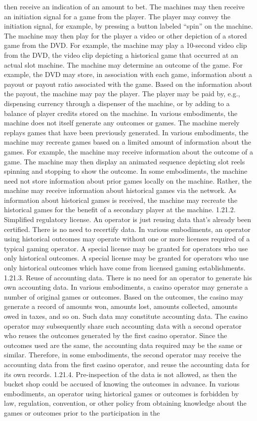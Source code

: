 \documentclass[11pt,a4paper]{article}
\begin{document}
then receive an indication of an amount to bet. The machines may then receive an initiation signal for a game from the player. The player may convey the initiation signal, for example, by pressing a button labeled “spin” on the machine. The machine may then play for the player a video or other depiction of a stored game from the DVD. For example, the machine may play a 10-second video clip from the DVD, the video clip depicting a historical game that occurred at an actual slot machine. The machine may determine an outcome of the game. For example, the DVD may store, in association with each game, information about a payout or payout ratio associated with the game. Based on the information about the payout, the machine may pay the player. The player may be paid by, e.g., dispensing currency through a dispenser of the machine, or by adding to a balance of player credits stored on the machine. In various embodiments, the machine does not itself generate any outcomes or games. The machine merely replays games that have been previously generated. In various embodiments, the machine may recreate games based on a limited amount of information about the games. For example, the machine may receive information about the outcome of a game. The machine may then display an animated sequence depicting slot reels spinning and stopping to show the outcome. In some embodiments, the machine need not store information about prior games locally on the machine. Rather, the machine may receive information about historical games via the network. As information about historical games is received, the machine may recreate the historical games for the benefit of a secondary player at the machine. 1.21.2. Simplified regulatory license. An operator is just reusing data that's already been certified. There is no need to recertify data. In various embodiments, an operator using historical outcomes may operate without one or more licenses required of a typical gaming operator. A special license may be granted for operators who use only historical outcomes. A special license may be granted for operators who use only historical outcomes which have come from licensed gaming establishments. 1.21.3. Reuse of accounting data. There is no need for an operator to generate his own accounting data. In various embodiments, a casino operator may generate a number of original games or outcomes. Based on the outcomes, the casino may generate a record of amounts won, amounts lost, amounts collected, amounts owed in taxes, and so on. Such data may constitute accounting data. The casino operator may subsequently share such accounting data with a second operator who reuses the outcomes generated by the first casino operator. Since the outcomes used are the same, the accounting data required may be the same or similar. Therefore, in some embodiments, the second operator may receive the accounting data from the first casino operator, and reuse the accounting data for its own records. 1.21.4. Pre-inspection of the data is not allowed, as then the bucket shop could be accused of knowing the outcomes in advance. In various embodiments, an operator using historical games or outcomes is forbidden by law, regulation, convention, or other policy from obtaining knowledge about the games or outcomes prior to the participation in the 
\end{document}

